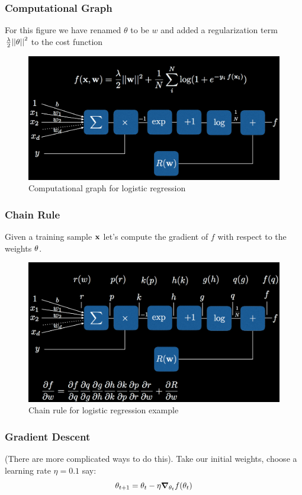 \documentclass[10pt]{beamer}
\begin{document}
\begin{frame}
	\frametitle{Computational Graph}
	For this figure we have renamed $\theta$ to be $w$ and added a regularization term $\frac{\lambda}{2} \abs{\abs{\vb{\theta}}}^2$ to the cost function
	\begin{figure}
		\includegraphics[width=\textwidth,height=0.5\textheight,keepaspectratio=true]{computational_graph.png}
		\caption{Computational graph for logistic regression}
		\label{fig:computational-graph}
	\end{figure}
\end{frame}

\begin{frame}
	\frametitle{Chain Rule}
	Given a training sample $\vb{x}$ let’s compute the gradient of $f$ with respect to the weights $\vb{\theta}$.
	\begin{figure}
		\includegraphics[width=\textwidth,height=0.5\textheight,keepaspectratio=true]{computational_derivatives.png}
		\caption{Chain rule for logistic regression example}
	\end{figure}
\end{frame}

\begin{frame}
	\frametitle{Gradient Descent}
	(There are more complicated ways to do this).
	Take our initial weights, choose a learning rate $\eta = 0.1$ say:
	\begin{equation}
		\vb{\theta}_{t+1} = \vb{\theta}_t - \eta \grad_{\vb{\theta}_t} f (\vb{\theta}_t)
	\end{equation}
\end{frame}
\end{document}
